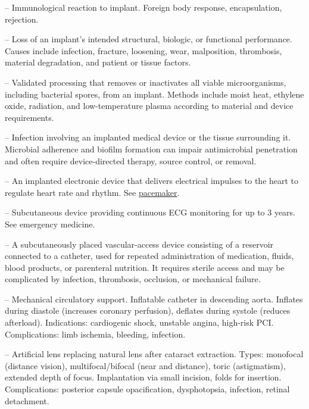 -- Immunological reaction to implant. Foreign body response, encapsulation, rejection.


-- Loss of an implant’s intended structural, biologic, or functional performance. Causes include infection, fracture, loosening, wear, malposition, thrombosis, material degradation, and patient or tissue factors.

-- Validated processing that removes or inactivates all viable microorganisms, including bacterial spores, from an implant. Methods include moist heat, ethylene oxide, radiation, and low-temperature plasma according to material and device requirements.

-- Infection involving an implanted medical device or the tissue surrounding it. Microbial adherence and biofilm formation can impair antimicrobial penetration and often require device-directed therapy, source control, or removal.

-- An implanted electronic device that delivers electrical impulses to the heart to regulate heart rate and rhythm. See \hyperlink{Pacemaker}{pacemaker}.

-- Subcutaneous device providing continuous ECG monitoring for up to 3 years. See emergency medicine.

-- A subcutaneously placed vascular-access device consisting of a reservoir connected to a catheter, used for repeated administration of medication, fluids, blood products, or parenteral nutrition. It requires sterile access and may be complicated by infection, thrombosis, occlusion, or mechanical failure.

-- Mechanical circulatory support. Inflatable catheter in descending aorta. Inflates during diastole (increases coronary perfusion), deflates during systole (reduces afterload). Indications: cardiogenic shock, unstable angina, high-risk PCI. Complications: limb ischemia, bleeding, infection.

-- Artificial lens replacing natural lens after cataract extraction. Types: monofocal (distance vision), multifocal/bifocal (near and distance), toric (astigmatism), extended depth of focus. Implantation via small incision, folds for insertion. Complications: posterior capsule opacification, dysphotopsia, infection, retinal detachment.

